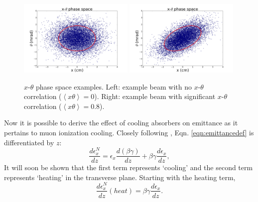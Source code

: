 \begin{figure}
  \begin{center}
    \includegraphics[width=0.49\textwidth]{Figures/ellipse0} 
    \includegraphics[width=0.49\textwidth]{Figures/ellipse1} 
  \caption[$x$-$\theta$ phase space examples.]{$x$-$\theta$ phase space examples. Left: example beam with no $x$-$\theta$ correlation ($\left<x\theta\right>=0$). Right: example beam with significant $x$-$\theta$ correlation ($\left<x\theta\right>=0.8$).}
  \label{fig:ellipses}
 \end{center}
\end{figure}

Now it is possible to derive the effect of cooling absorbers on emittance as it pertains to muon ionization cooling. Closely following \cite{Fernow}, Eqn. \ref{eqn:emittancedef} is differentiated by $z$:
%
\begin{equation}
\label{eqn:emittance1}
\frac{d\epsilon_x^N}{dz}=\epsilon_x \frac{d(\beta\gamma)}{dz}+\beta\gamma\frac{d\epsilon_x}{dz},
\end{equation}
%
It will soon be shown that the first term represents `cooling' and the second term represents `heating' in the transverse plane. Starting with the heating term,
%
\begin{equation} \nonumber
\frac{d\epsilon_x^N}{dz}(heat)=\beta\gamma\frac{d\epsilon_x}{dz}.
\end{equation}
%

